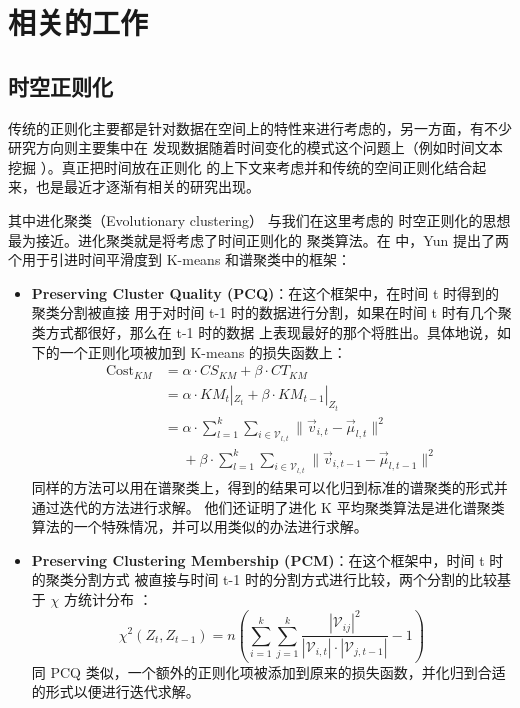 \chapter{相关的工作}

\section{时空正则化}
传统的正则化主要都是针对数据在空间上的特性来进行考虑的，另一方面，有不少研究方向则主要集中在
发现数据随着时间变化的模式这个问题上（例如时间文本挖掘 \cite{mei2005det}）。真正把时间放在正则化
的上下文来考虑并和传统的空间正则化结合起来，也是最近才逐渐有相关的研究出现。

其中进化聚类（Evolutionary clustering）\cite{chakrabarti2006ec,chi2007esc} 与我们在这里考虑的
时空正则化的思想最为接近。进化聚类就是将考虑了时间正则化的
聚类算法。在 \cite{chi2007esc} 中，Yun 提出了两个用于引进时间平滑度到 K-means 和谱聚类中的框架：

\begin{itemize}
  \item \textbf{Preserving Cluster Quality (PCQ)}：在这个框架中，在时间 t 时得到的聚类分割被直接
      用于对时间 t-1 时的数据进行分割，如果在时间 t 时有几个聚类方式都很好，那么在 t-1 时的数据
      上表现最好的那个将胜出。具体地说，如下的一个正则化项被加到 K-means 的损失函数上：
\begin{align*}
\text{Cost}_{KM}&=\alpha \cdot CS_{KM}+\beta\cdot CT_{KM} \\
&=\alpha \cdot KM_t|_{Z_t} + \beta \cdot KM_{t-1}|_{Z_t} \\
&=\alpha\cdot\sum_{l=1}^k\sum_{i\in\mathcal{V}_{l,t}}\|\vec{v}_{i,t}-\vec{\mu}_{l,t}\|^2
\\
&\mathrel{\phantom{=}}{}+\beta\cdot\sum_{l=1}^k\sum_{i\in\mathcal{V}_{l,t}}\|\vec{v}_{i,t-1}-\vec{\mu}_{l,t-1}\|^2
\end{align*}
      同样的方法可以用在谱聚类上，得到的结果可以化归到标准的谱聚类的形式并通过迭代的方法进行求解。
      他们还证明了进化 K 平均聚类算法是进化谱聚类算法的一个特殊情况，并可以用类似的办法进行求解。
  \item \textbf{Preserving Clustering Membership (PCM)}：在这个框架中，时间 t 时的聚类分割方式
      被直接与时间 t-1 时的分割方式进行比较，两个分割的比较基于 $\chi$ 方统计分布 \cite{hubert1985cp}：
\[
\chi^2(Z_t,Z_{t-1})=n\left(\sum_{i=1}^k\sum_{j=1}^k\frac{|\mathcal{V}_{ij}|^2}{|\mathcal{V}_{i,t}|
\cdot |\mathcal{V}_{j,t-1}|}-1\right)
\]
      同 PCQ 类似，一个额外的正则化项被添加到原来的损失函数，并化归到合适的形式以便进行迭代求解。
\end{itemize}

